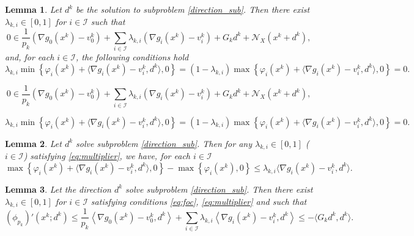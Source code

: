 \documentclass[10pt,a4paper]{amsart}
\newtheorem{lemma}{Lemma}
\begin{document}
\begin{lemma}\label{lem:dk_foc}
Let $d^k$ be the solution to subproblem \eqref{direction_sub}. Then there {exist $\lambda_{k,i} \in [0,1]$ for $i \in \mathcal{I}$} such that
\begin{equation}\label{eq:foc} 
0 \in \frac{1}{p_k}\left(\nabla g_0(x^k)-v_0^k\right) + {\sum_{i\in\mathcal{I}} \lambda_{k,i} \left(\nabla g_i(x^k)-v_i^k\right)} + {G_k} d^k+\mathcal N_X \left(x^k+d^k\right), 
\end{equation}
and, for each $i\in\mathcal{I}$, the following conditions hold
\begin{equation}\label{eq:multiplier}
\lambda_{k,i} \min\left\{ \varphi_i(x^k) + \langle \nabla g_i(x^k) - v_i^k, d^k \rangle, 0 \right\}=(1- \lambda_{k,i})\max\left\{ \varphi_i(x^k) +  \langle \nabla g_i(x^k) - v_i^k, d^k \rangle, 0 \right\} =0.
\end{equation} 
\end{lemma}\vspace*{0.05in}

\begin{equation} 
0 \in \frac{1}{p_k}\left(\nabla g_0(x^k)-v_0^k\right) + {\sum_{i\in\mathcal{I}} \lambda_{k,i} \left(\nabla g_i(x^k)-v_i^k\right)} + {G_k} d^k+\mathcal N_X \left(x^k+d^k\right), 
\end{equation}

\begin{equation}
\lambda_{k,i} \min\left\{ \varphi_i(x^k) + \langle \nabla g_i(x^k) - v_i^k, d^k \rangle, 0 \right\}=(1- \lambda_{k,i})\max\left\{ \varphi_i(x^k) +  \langle \nabla g_i(x^k) - v_i^k, d^k \rangle, 0 \right\} =0.
\end{equation} 

\begin{lemma}\label{lemma:multiplier_inequality}
Let $d^k$ solve subproblem \eqref{direction_sub}. Then for any {$\lambda_{k,i} \in \left[0, 1\right]$ ($i\in\mathcal{I}$)} satisfying \eqref{eq:multiplier}, we have, for each {$i \in \mathcal{I}$}
\begin{equation}\label{eq:multiplier_inequality}
\max\left\{\varphi_i(x^k) + \langle \nabla g_i(x^k) - v_i^k, d^k \rangle, 0\right\} - \max\left\{\varphi_i(x^k), 0\right\} \le  \lambda_{k,i} \langle \nabla g_i(x^k) - v_i^k, d^k \rangle.
\end{equation}
\end{lemma}

\begin{lemma}\label{lemma:descent_direction}
Let the direction $d^k$ solve subproblem \eqref{direction_sub}. Then there exist {$\lambda_{k,i} \in [0,1]$ for $i\in\mathcal{I}$} satisfying  conditions \eqref{eq:foc}, \eqref{eq:multiplier} and such that
\begin{equation}\label{eq:descent_direction}
(\phi_{p_k})'(x^k; d^k) \le 
\frac{1}{p_k} \left\langle \nabla g_0(x^k) - v_0^k, d^k \right\rangle 
+ \sum_{i\in\mathcal I} \lambda_{k,i} \left\langle\nabla g_i(x^k)-v_i^k, d^k\right\rangle \le -\langle G_kd^k,d^k \rangle.
\end{equation}
\end{lemma}
\end{document}
